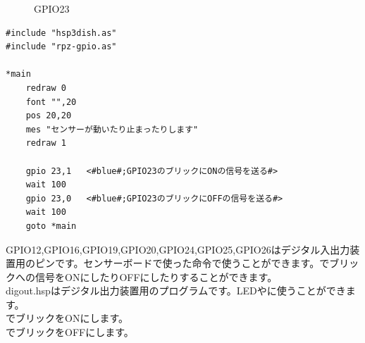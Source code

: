 \begin{figure}[H]
\begin{minipage}[t]{0.5\columnwidth}
    \caption{GPIO23}
  \end{minipage}
\end{figure}

\begin{lstlisting}[caption=digout.hsp,label=digout.hsp]
#include "hsp3dish.as"
#include "rpz-gpio.as"

*main
	redraw 0
	font "",20
	pos 20,20
	mes "センサーが動いたり止まったりします"
	redraw 1

	gpio 23,1	<#blue#;GPIO23のブリックにONの信号を送る#>
	wait 100
	gpio 23,0	<#blue#;GPIO23のブリックにOFFの信号を送る#>
	wait 100
	goto *main
\end{lstlisting}

GPIO12,GPIO16,GPIO19,GPIO20,GPIO24,GPIO25,GPIO26はデジタル入出力装置用のピンです。センサーボードで使った命令で使うことができます。でブリックへの信号をONにしたりOFFにしたりすることができます。\\

digout.hspはデジタル出力装置用のプログラムです。LEDやに使うことができます。\\
でブリックをONにします。\\
でブリックをOFFにします。\\

\begin{tcolorbox}[title=\useOmetoi]
\begin{enumerate}
\end{enumerate}
\end{tcolorbox}

